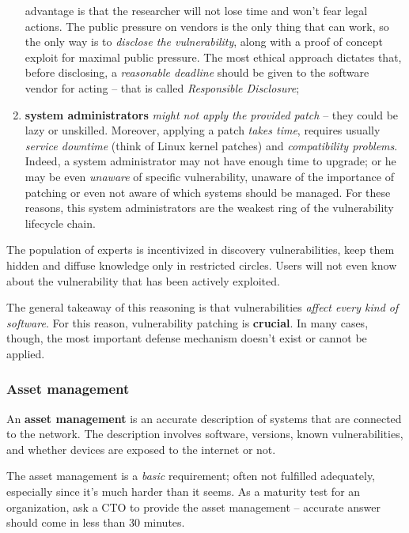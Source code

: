 \documentclass[10pt]{extbook}
\begin{document}
\begin{enumerate}
        advantage is that the researcher will not lose time and won't fear
        legal actions. The public pressure on vendors is the only thing that
        can work, so the only way is to \emph{disclose the vulnerability},
        along with a proof of concept exploit for maximal public pressure. The
        most ethical approach dictates that, before disclosing, a
        \emph{reasonable deadline} should be given to the software vendor for
        acting -- that is called \emph{Responsible Disclosure};
    \item \textbf{system administrators} \emph{might not apply the provided
        patch} -- they could be lazy or unskilled. Moreover, applying a patch
        \emph{takes time}, requires usually \emph{service downtime} (think of
        Linux kernel patches) and \emph{compatibility problems}. Indeed, a
        system administrator may not have enough time to upgrade; or he may be
        even \emph{unaware} of specific vulnerability, unaware of the
        importance of patching or even not aware of which systems should be
        managed. For these reasons, this system administrators are the weakest
        ring of the vulnerability lifecycle chain.
\end{enumerate}

The population of experts is incentivized in discovery vulnerabilities, keep
them hidden and diffuse knowledge only in restricted circles. Users will not
even know about the vulnerability that has been actively exploited.

The general takeaway of this reasoning is that vulnerabilities \emph{affect
every kind of software}. For this reason, vulnerability patching is
\textbf{crucial}. In many cases, though, the most important defense mechanism
doesn't exist or cannot be applied.

\subsubsection{Asset management}

An \textbf{asset management} is an accurate description of systems that are
connected to the network. The description involves software, versions, known
vulnerabilities, and whether devices are exposed to the internet or not.

The asset management is a \emph{basic} requirement; often not fulfilled
adequately, especially since it's much harder than it seems. As a maturity test
for an organization, ask a CTO to provide the asset management -- accurate
answer should come in less than 30 minutes.
\end{document}
